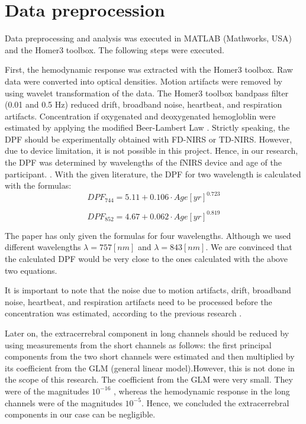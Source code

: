 \section {Data preprocession}
Data preprocessing and analysis was executed in MATLAB (Mathworks, USA) and the Homer3 toolbox. The following steps were executed.

First, the hemodynamic response was extracted with the Homer3 toolbox. Raw data were converted into optical densities. Motion artifacts were removed by using wavelet transformation of the data. The Homer3 toolbox bandpass filter (0.01 and 0.5 Hz) reduced drift, broadband noise, heartbeat, and respiration artifacts. Concentration if oxygenated and deoxygenated hemogloblin were estimated by applying the modified Beer-Lambert Law  \cite {Delpy_1988}. Strictly speaking, the DPF should be experimentally obtained with FD-NIRS or TD-NIRS. However, due to device limitation, it is not possible in this project. Hence, in our research, the DPF was determined by wavelengths of the fNIRS device and age of the participant. \cite {Duncan1996MeasurementOC}. With the given literature, the DPF for two wavelength is calculated with the formulas:
\[
DPF_{744} = 5.11 + 0.106 \cdot Age[yr]^{0.723}
\]

\[
DPF_{852} = 4.67 + 0.062 \cdot Age[yr]^{0.819}
\]

The paper has only given the formulas for four wavelengths. Although we used different wavelengths $\lambda = 757 [nm]$ and $\lambda = 843 [nm]$. We are convinced that the calculated DPF would be very close to the ones calculated with the above two equations.


It is important to note that the noise due to motion artifacts, drift, broadband noise, heartbeat, and respiration artifacts need to be processed before the concentration was estimated, according to the previous research \cite {Huppert:09}.

Later on, the extracerrebral component in long channels should be reduced by using measurements from the short channels as follows: the first principal components from the two short channels were estimated and then multiplied by its coefficient from the GLM (general linear model).However, this is not done in the scope of this research. The coefficient from the GLM were very small. They were of the magnitudes $10^{-16}$ , whereas the hemodynamic response in the long channels were of the magnitudes $10^{-5}$. Hence, we concluded the extracerrebral components in our case can be negligible.

